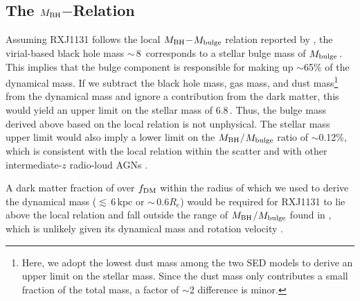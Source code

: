 \documentclass[]{emulateapj}
\begin{document}
\subsection{The $M_{\rm BH}$$-$\mdyn Relation}
Assuming RXJ1131 follows the local $M_{\rm BH}$$-$$M_{\rm bulge}$ relation reported by \citet{HR04a}, 
the virial-based black hole mass \mbh$\sim$\,8\,\Msun \citep{Sluse12a} corresponds 
to a stellar bulge mass of $M_{\rm bulge}$\,\Msun.
This implies that the bulge component is responsible for making up $\sim$65\% of the dynamical mass. 
If we subtract the black hole mass, gas mass, and dust mass\footnote{Here, we adopt the lowest dust mass among the two SED models to derive an upper limit on the stellar mass. Since the dust mass only contributes a small fraction of the total mass, a factor of $\sim$2 difference is minor.}
from the dynamical mass and ignore a contribution from the dark matter, this would
yield an upper limit on the stellar mass of 6.8\,\Msun. 
Thus, the bulge mass derived above based on the local relation is not unphysical.
The stellar mass upper limit would also imply a lower limit on the 
$M_{\rm BH}$$/$$M_{\rm bulge}$ ratio of $\sim$0.12\%, which is consistent with the local relation within the scatter and with other intermediate-$z$ radio-loud AGNs \citep{McLure06a}. 

A dark matter fraction of over $f_{\rm DM}$ within the radius of which we used to derive the 
dynamical mass (\ie $\lesssim$\,6\,kpc or $\sim$\,0.6$R_e$) would be required for RXJ1131 to 
lie above the local relation and fall outside the range of $M_{\rm BH}$$/$$M_{\rm bulge}$ found in 
\citet{McLure06a}, which is unlikely given its dynamical mass and rotation velocity 
\citep{Courteau15a}.
\end{document}
